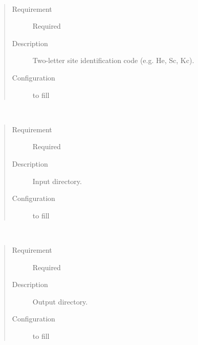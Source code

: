 \documentclass[letterpaper,10pt,english]{sphinxmanual}
\begin{document}
\begin{fulllineitems}
\label{\detokenize{input_files/RunControl/File_related_options:cmdoption-arg-filecode}}~\begin{quote}\begin{description}
\item[{Requirement}] \leavevmode
Required

\item[{Description}] \leavevmode
Two-letter site identification code (e.g. He, Sc, Kc).

\item[{Configuration}] \leavevmode
to fill

\end{description}\end{quote}

\end{fulllineitems}


\begin{fulllineitems}
\label{\detokenize{input_files/RunControl/File_related_options:cmdoption-arg-fileinputpath}}~\begin{quote}\begin{description}
\item[{Requirement}] \leavevmode
Required

\item[{Description}] \leavevmode
Input directory.

\item[{Configuration}] \leavevmode
to fill

\end{description}\end{quote}

\end{fulllineitems}


\begin{fulllineitems}
\label{\detokenize{input_files/RunControl/File_related_options:cmdoption-arg-fileoutputpath}}~\begin{quote}\begin{description}
\item[{Requirement}] \leavevmode
Required

\item[{Description}] \leavevmode
Output directory.

\item[{Configuration}] \leavevmode
to fill

\end{description}\end{quote}

\end{fulllineitems}
\end{document}
